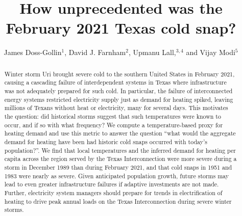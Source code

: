 \documentclass[12pt]{iopart}
\begin{document}
\title{How unprecedented was the February 2021 Texas cold snap?}

\author{James Doss-Gollin$^1$, David J. Farnham$^2$, Upmanu Lall,$^{3,4}$ and Vijay Modi$^5$}
\address{$^1$ Department of Civil and Environmental Engineering, Rice University, Houston, TX, USA (ORCID 0000-0002-3428-2224)}
\address{$^2$ Department of Global Ecology, Carnegie Institution for Science, Stanford, CA, USA (ORCID 0000-0002-6690-4251)}
\address{$^3$ Columbia Water Center, Columbia University, New York, NY, USA (ORCID 0000-0003-0529-8128)}
\address{$^4$ Department of Earth and Environmental Engineering, Columbia University, New York, NY, USA}
\address{$^4$ Department of Mechanical Engineering, Columbia University, New York, NY, USA (ORCID 0000-0003-2513-0437)}
\vspace{10pt}

\begin{abstract}
  Winter storm Uri brought severe cold to the southern United States in February 2021, causing a cascading failure of interdependent systems in Texas where infrastructure was not adequately prepared for such cold.
  In particular, the failure of interconnected energy systems restricted electricity supply just as demand for heating spiked, leaving millions of Texans without heat or electricity, many for several days.
  This motivates the question: did historical storms suggest that such temperatures were known to occur, and if so with what frequency?
  We compute a temperature-based proxy for heating demand and use this metric to answer the question ``what would the aggregate demand for heating have been had historic cold snaps occurred with today's population?''.
  We find that local temperatures and the inferred demand for heating per capita across the region served by the Texas Interconnection were more severe during a storm in December 1989 than during February 2021, and that cold snaps in 1951 and 1983 were nearly as severe.
  Given anticipated population growth, future storms may lead to even greater infrastructure failures if adaptive investments are not made.
  Further, electricity system managers should prepare for trends in electrification of heating to drive peak annual loads on the Texas Interconnection during severe winter storms.
\end{abstract}

\submitto{\ERL}
\maketitle
\end{document}
